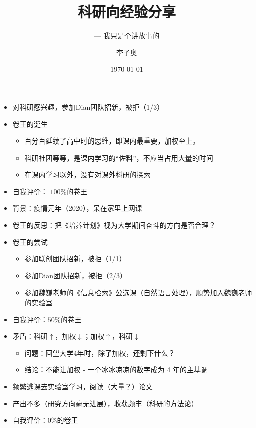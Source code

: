 \documentclass{ctexbeamer} %
\author[lza]{李子奥}
\title{科研向经验分享}
\subtitle{--- 我只是个讲故事的}
\institute{自动化1903班}
\date{\today}
\begin{document}
\maketitle

\begin{frame}
	\begin{itemize}
		\item 对科研感兴趣，参加Dian团队招新，被拒（1/3）
		\item 卷王的诞生
		\begin{itemize}
			\item 百分百延续了高中时的思维，即课内最重要，加权至上。
			\item 科研社团等等，是课内学习的“佐料”，不应当占用大量的时间
			\item 在课内学习以外，没有对课外科研的探索
		\end{itemize}
		\item 自我评价： $100\%$的卷王
	\end{itemize}
\end{frame}

\begin{frame}
	\begin{itemize}
		\item 背景：疫情元年（2020），呆在家里上网课
		\item 卷王的反思：把《培养计划》视为大学期间奋斗的方向是否合理？
		\item 卷王的尝试
		\begin{itemize}
			\item 参加联创团队招新，被拒（1/1）
			\item 参加Dian团队招新，被拒（2/3）
			\item 参加魏巍老师的《信息检索》公选课（自然语言处理），顺势加入魏巍老师的实验室
		\end{itemize}
		\item 自我评价：$50\%$的卷王
	\end{itemize}
\end{frame}

\begin{frame}
	\begin{itemize}
		\item 矛盾：科研$\uparrow$，加权$\downarrow$；加权$\uparrow$，科研$\downarrow$
		\begin{itemize}
			\item 问题：回望大学4年时，除了加权，还剩下什么？
			\item 结论：不能让加权 - 一个冰冰凉凉的数字成为 4 年的主基调
		\end{itemize}
		\item 频繁逃课去实验室学习，阅读（大量？\hspace{0.1em}）论文
		\item 产出不多（研究方向毫无进展），收获颇丰（科研的方法论）
		\item 自我评价：$0\%$的卷王
	\end{itemize}
\end{frame}
\end{document}
